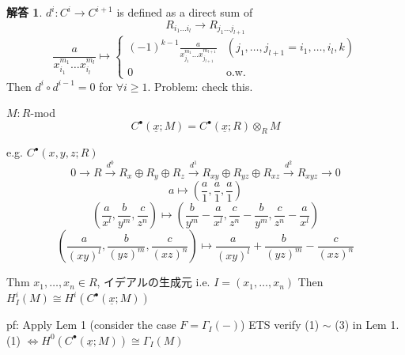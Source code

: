 \documentclass[12pt]{jlreq}
\theoremstyle{definition}
\newtheorem*{solution}{解答}
\begin{document}
\begin{solution}
$d^i : C^i \to C^{i+1}$ is defined as a direct sum of
\[
R_{i_1 \dots i_l} \to R_{j_1 \dots j_{l+1}}
\]
\[
\frac{a}{x_{i_1}^{m_1} \dots x_{i_l}^{m_l}} \mapsto 
\begin{cases} 
(-1)^{k-1} \frac{a}{x_{j_1}^{m_1} \dots x_{j_{l+1}}^{m_{l+1}}} & (j_1, \dots, j_{l+1} = i_1, \dots, i_l, k) \\
0 & \text{o.w.}
\end{cases}
\]
Then $d^i \circ d^{i-1} = 0$ for $\forall i \ge 1$.
Problem: check this.

$M: R$-mod
\[
C^\bullet(\underline{x}; M) = C^\bullet(\underline{x}; R) \otimes_R M
\]

e.g. $C^\bullet(x, y, z; R)$
\[
0 \to R \xrightarrow{d^0} R_x \oplus R_y \oplus R_z \xrightarrow{d^1} R_{xy} \oplus R_{yz} \oplus R_{xz} \xrightarrow{d^2} R_{xyz} \to 0
\]
\[
a \mapsto \left( \frac{a}{1}, \frac{a}{1}, \frac{a}{1} \right)
\]
\[
\left( \frac{a}{x^l}, \frac{b}{y^m}, \frac{c}{z^n} \right) \mapsto \left( \frac{b}{y^m} - \frac{a}{x^l}, \frac{c}{z^n} - \frac{b}{y^m}, \frac{c}{z^n} - \frac{a}{x^l} \right)
\]
\[
\left( \frac{a}{(xy)^l}, \frac{b}{(yz)^m}, \frac{c}{(xz)^n} \right) \mapsto \frac{a}{(xy)^l} + \frac{b}{(yz)^m} - \frac{c}{(xz)^n}
\]

Thm
$x_1, \dots, x_n \in R$, イデアルの生成元 i.e. $I = (x_1, \dots, x_n)$
Then $H_I^i(M) \cong H^i(C^\bullet(\underline{x}; M))$

pf: Apply Lem 1 (consider the case $F = \Gamma_I(-)$)
ETS verify (1) $\sim$ (3) in Lem 1.
(1) $\iff H^0(C^\bullet(\underline{x}; M)) \cong \Gamma_I(M)$
\end{solution}
\end{document}
